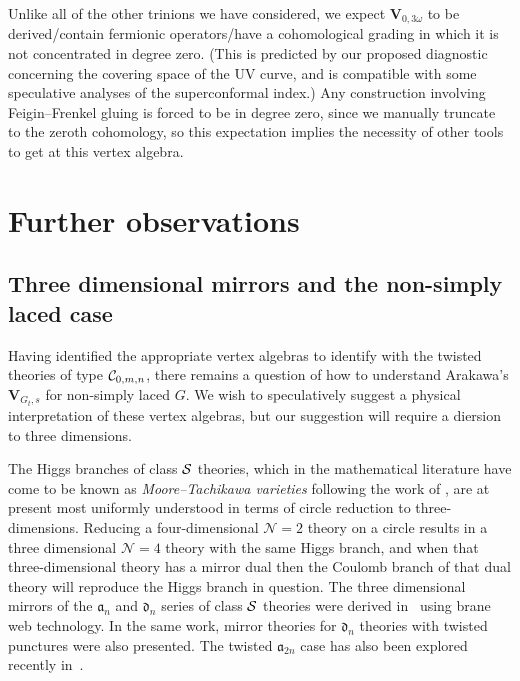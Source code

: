 \documentclass[a4paper]{article}
\def\CC{{\cal C}}
\def\SS{{\cal S}}
\def\af{\mathfrak{a}}
\def\df{\mathfrak{d}}
\def\V{\mathbf{V}}
\begin{document}
Unlike all of the other trinions we have considered, we expect $\V_{0,3\omega}$ to be derived/contain fermionic operators/have a cohomological grading in which it is not concentrated in degree zero. (This is predicted by our proposed diagnostic concerning the covering space of the UV curve, and is compatible with some speculative analyses of the superconformal index.) Any construction involving Feigin--Frenkel gluing is forced to be in degree zero, since we manually truncate to the zeroth cohomology, so this expectation implies the necessity of other tools to get at this vertex algebra.

\section{\label{sec:conc_remarks}Further observations}

\subsection{\label{ssec:conc_remarks/3d}Three dimensional mirrors and the non-simply laced case}

Having identified the appropriate vertex algebras to identify with the twisted theories of type $\CC_{0,m,n}$, there remains a question of how to understand Arakawa's $\V_{G_t,s}$ for non-simply laced $G$. We wish to speculatively suggest a physical interpretation of these vertex algebras, but our suggestion will require a diersion to three dimensions.

The Higgs branches of class $\SS$ theories, which in the mathematical literature have come to be known as \emph{Moore--Tachikawa varieties} following the work of \cite{Moore:2011ee}, are at present most uniformly understood in terms of circle reduction to three-dimensions. Reducing a four-dimensional $\mathcal{N}=2$ theory on a circle results in a three dimensional $\mathcal{N}=4$ theory with the same Higgs branch, and when that three-dimensional theory has a mirror dual then the Coulomb branch of that dual theory will reproduce the Higgs branch in question. The three dimensional mirrors of the $\af_n$ and $\df_n$ series of class $\SS$ theories were derived in~\cite{Benini:2010uu} using brane web technology. In the same work, mirror theories for $\df_n$ theories with twisted punctures were also presented. The twisted $\af_{2n}$ case has also been explored recently in~\cite{Beratto:2020wmn}.
\end{document}
